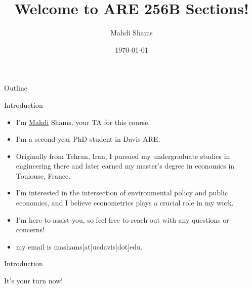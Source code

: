 \documentclass{beamer}
\title{Welcome to ARE 256B Sections!}
\author{Mahdi Shams}
\date{\today}
\begin{document}
\begin{frame}
\titlepage 
\end{frame}


\begin{frame}{Outline}
\tableofcontents
\end{frame}

\begin{frame}{Introduction}
\begin{itemize}
    \item I'm \href{https://www.youtube.com/watch?v=J9wRl5TVFvc}{Mahdi} Shams,
     your TA for this course. 
    \item I'm a second-year PhD student in Davis ARE. 
    \item Originally from Tehran, Iran, I pursued my undergraduate studies in 
    engineering there and later earned my master's degree in economics in 
    Toulouse, France.
    \item I'm interested in the intersection of environmental policy and public 
    economics, and I believe econometrics plays a crucial role in my work. 
  
  
  \item I'm here to assist you, so feel free to reach out with any questions or 
    concerns!
 \item my email is mashams[at]ucdavis[dot]edu.
  
\end{itemize}

\end{frame}
\begin{frame}{Introduction}
\begin{center}
    \Huge It's your turn now!
\end{center}

\end{frame} 
\end{document}
